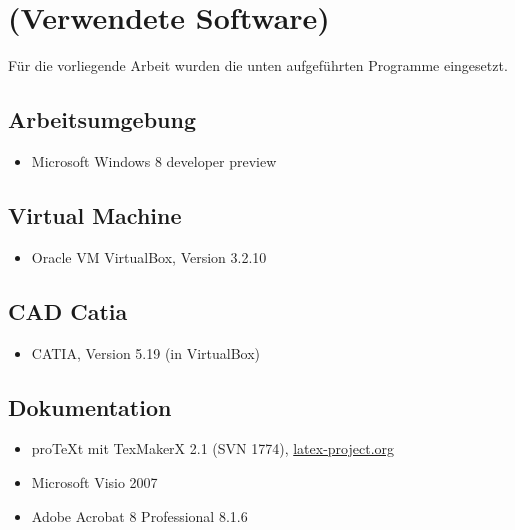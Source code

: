 \section{(Verwendete Software)}\label{software}
Für die vorliegende Arbeit wurden die unten aufgeführten Programme eingesetzt.

\subsection*{Arbeitsumgebung}\label{wintool}
\begin{itemize}
	\item Microsoft Windows 8 developer preview
\end{itemize}

\subsection*{Virtual Machine}\label{vm}
\begin{itemize}
	\item Oracle VM VirtualBox, Version 3.2.10
\end{itemize}

\subsection*{CAD Catia}\label{catia}
\begin{itemize}
	\item CATIA, Version 5.19 (in VirtualBox)
\end{itemize}

\subsection*{Dokumentation}\label{dokutools}
\begin{itemize}
	\item proTeXt mit TexMakerX 2.1 (SVN 1774), \href{http://www.latex-project.org/ftp.html}{latex-project.org}
	\item Microsoft Visio 2007
	\item Adobe Acrobat 8 Professional 8.1.6
\end{itemize}
